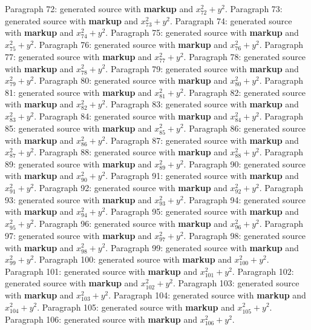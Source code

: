 \documentclass{article}
\begin{document}
Paragraph 72: generated source with \textbf{markup} and $x_{72}^2 + y^2$.
Paragraph 73: generated source with \textbf{markup} and $x_{73}^2 + y^2$.
Paragraph 74: generated source with \textbf{markup} and $x_{74}^2 + y^2$.
Paragraph 75: generated source with \textbf{markup} and $x_{75}^2 + y^2$.
Paragraph 76: generated source with \textbf{markup} and $x_{76}^2 + y^2$.
Paragraph 77: generated source with \textbf{markup} and $x_{77}^2 + y^2$.
Paragraph 78: generated source with \textbf{markup} and $x_{78}^2 + y^2$.
Paragraph 79: generated source with \textbf{markup} and $x_{79}^2 + y^2$.
Paragraph 80: generated source with \textbf{markup} and $x_{80}^2 + y^2$.
Paragraph 81: generated source with \textbf{markup} and $x_{81}^2 + y^2$.
Paragraph 82: generated source with \textbf{markup} and $x_{82}^2 + y^2$.
Paragraph 83: generated source with \textbf{markup} and $x_{83}^2 + y^2$.
Paragraph 84: generated source with \textbf{markup} and $x_{84}^2 + y^2$.
Paragraph 85: generated source with \textbf{markup} and $x_{85}^2 + y^2$.
Paragraph 86: generated source with \textbf{markup} and $x_{86}^2 + y^2$.
Paragraph 87: generated source with \textbf{markup} and $x_{87}^2 + y^2$.
Paragraph 88: generated source with \textbf{markup} and $x_{88}^2 + y^2$.
Paragraph 89: generated source with \textbf{markup} and $x_{89}^2 + y^2$.
Paragraph 90: generated source with \textbf{markup} and $x_{90}^2 + y^2$.
Paragraph 91: generated source with \textbf{markup} and $x_{91}^2 + y^2$.
Paragraph 92: generated source with \textbf{markup} and $x_{92}^2 + y^2$.
Paragraph 93: generated source with \textbf{markup} and $x_{93}^2 + y^2$.
Paragraph 94: generated source with \textbf{markup} and $x_{94}^2 + y^2$.
Paragraph 95: generated source with \textbf{markup} and $x_{95}^2 + y^2$.
Paragraph 96: generated source with \textbf{markup} and $x_{96}^2 + y^2$.
Paragraph 97: generated source with \textbf{markup} and $x_{97}^2 + y^2$.
Paragraph 98: generated source with \textbf{markup} and $x_{98}^2 + y^2$.
Paragraph 99: generated source with \textbf{markup} and $x_{99}^2 + y^2$.
Paragraph 100: generated source with \textbf{markup} and $x_{100}^2 + y^2$.
Paragraph 101: generated source with \textbf{markup} and $x_{101}^2 + y^2$.
Paragraph 102: generated source with \textbf{markup} and $x_{102}^2 + y^2$.
Paragraph 103: generated source with \textbf{markup} and $x_{103}^2 + y^2$.
Paragraph 104: generated source with \textbf{markup} and $x_{104}^2 + y^2$.
Paragraph 105: generated source with \textbf{markup} and $x_{105}^2 + y^2$.
Paragraph 106: generated source with \textbf{markup} and $x_{106}^2 + y^2$.
\end{document}
